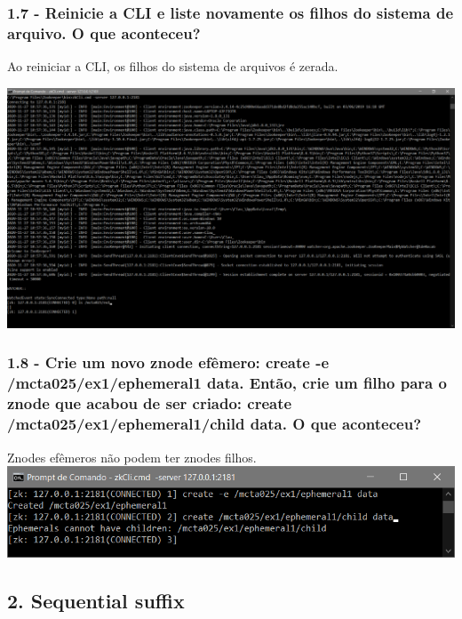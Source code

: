 \subsubsection{1.7 - Reinicie a CLI e liste novamente os filhos do sistema de arquivo. O que aconteceu?}
Ao reiniciar a CLI, os filhos do sistema de arquivos é zerada.
\newline

\begin{center}
\includegraphics[width=20cm]{pratica3/prints/roteiro 1.7.PNG}
\end{center}

\subsubsection{1.8 - Crie um novo znode efêmero: create -e /mcta025/ex1/ephemeral1 data. Então, crie um filho para o znode que acabou de ser criado: create /mcta025/ex1/ephemeral1/child data. O que aconteceu?}

Znodes efêmeros não podem ter znodes filhos.
\newline
\includegraphics{pratica3/prints/roteiro 1.8.PNG}

\subsection*{2. Sequential suffix}

